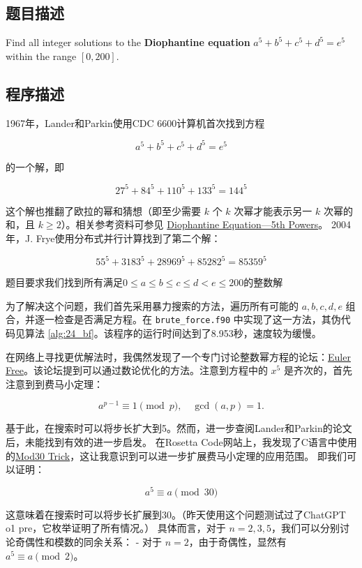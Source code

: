 \subsection{题目描述}
Find all integer solutions to the \textbf{Diophantine equation} \( a^5 + b^5 + c^5 + d^5 = e^5 \) within the range \([0, 200]\).
\subsection{程序描述}

1967年，Lander和Parkin使用CDC 6600计算机首次找到方程

\[
    a^5 + b^5 + c^5 + d^5 = e^5
\]

的一个解，即

\[
    27^5 + 84^5 + 110^5 + 133^5 = 144^5
\]

这个解也推翻了欧拉的幂和猜想（即至少需要 \(k\) 个 \(k\) 次幂才能表示另一 \(k\) 次幂的和，且 \(k \geq 2\)）。相关参考资料可参见 \href{https://mathworld.wolfram.com/DiophantineEquation5thPowers.html}{Diophantine Equation—5th Powers}。
2004年，J. Frye使用分布式并行计算找到了第二个解：

\[
    55^5 + 3183^5 + 28969^5 + 85282^5 = 85359^5
\]

题目要求我们找到所有满足$0 \leq a \leq b \leq c \leq d < e \leq 200 $的整数解

为了解决这个问题，我们首先采用暴力搜索的方法，遍历所有可能的 \(a, b, c, d, e\) 组合，并逐一检查是否满足方程。在 \texttt{brute\_force.f90} 中实现了这一方法，其伪代码见算法 \ref{alg:24_bf}。该程序的运行时间达到了8.953秒，速度较为缓慢。

在网络上寻找更优解法时，我偶然发现了一个专门讨论整数幂方程的论坛：\href{http://euler.free.fr/}{Euler Free}。该论坛提到可以通过数论优化的方法。注意到方程中的 \(x^5\) 是齐次的，首先注意到到费马小定理：

\[
    a^{p-1} \equiv 1 \pmod{p}, \quad \gcd(a,p)=1.
\]

基于此，在搜索时可以将步长扩大到5。然而，进一步查阅Lander和Parkin的论文后，未能找到有效的进一步启发。
在Rosetta Code网站上，我发现了C语言中使用的\href{https://rosettacode.org/wiki/Euler%27s_sum_of_powers_conjecture#C}{Mod30 Trick}，这让我意识到可以进一步扩展费马小定理的应用范围。
即我们可以证明：

\[
    a^5 \equiv a \pmod{30}
\]

这意味着在搜索时可以将步长扩展到30。（昨天使用这个问题测试过了ChatGPT o1 pre，它枚举证明了所有情况。）
具体而言，对于 \(n = 2, 3, 5\)，我们可以分别讨论奇偶性和模数的同余关系：
- 对于 \(n = 2\)，由于奇偶性，显然有 \(a^5 \equiv a \pmod{2}\)。


